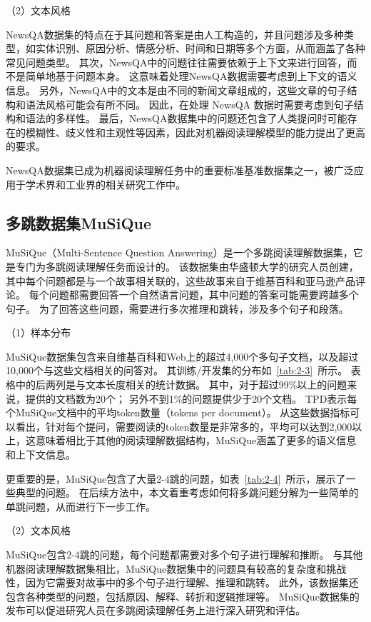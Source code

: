 

（2）文本风格

NewsQA数据集的特点在于其问题和答案是由人工构造的，并且问题涉及多种类型，如实体识别、原因分析、情感分析、时间和日期等多个方面，从而涵盖了各种常见问题类型。
其次，NewsQA中的问题往往需要依赖于上下文来进行回答，而不是简单地基于问题本身。
这意味着处理NewsQA数据需要考虑到上下文的语义信息。
另外，NewsQA中的文本是由不同的新闻文章组成的，这些文章的句子结构和语法风格可能会有所不同。
因此，在处理 NewsQA 数据时需要考虑到句子结构和语法的多样性。
最后，NewsQA数据集中的问题还包含了人类提问时可能存在的模糊性、歧义性和主观性等因素，因此对机器阅读理解模型的能力提出了更高的要求。

NewsQA数据集已成为机器阅读理解任务中的重要标准基准数据集之一，被广泛应用于学术界和工业界的相关研究工作中。

\subsection{多跳数据集MuSiQue}
MuSiQue（Multi-Sentence Question Answering）是一个多跳阅读理解数据集，它是专门为多跳阅读理解任务而设计的。
该数据集由华盛顿大学的研究人员创建，其中每个问题都是与一个故事相关联的，这些故事来自于维基百科和亚马逊产品评论。
每个问题都需要回答一个自然语言问题，其中问题的答案可能需要跨越多个句子。
为了回答这些问题，需要进行多次推理和跳转，涉及多个句子和段落。


（1）样本分布

MuSiQue数据集包含来自维基百科和Web上的超过4,000个多句子文档，以及超过10,000个与这些文档相关的问答对。
其训练/开发集的分布如~\ref{tab:2-3}~所示。
表格中的后两列是与文本长度相关的统计数据。
其中，对于超过99\%以上的问题来说，提供的文档数为20个；
另外不到1\%的问题提供少于20个文档。
TPD表示每个MuSiQue文档中的平均token数量（tokens per document）。
从这些数据指标可以看出，针对每个提问，需要阅读的token数量是非常多的，平均可以达到2,000以上，这意味着相比于其他的阅读理解数据结构，MuSiQue涵盖了更多的语义信息和上下文信息。



更重要的是，MuSiQue包含了大量2-4跳的问题，如表~\ref{tab:2-4}~所示，展示了一些典型的问题。
在后续方法中，本文着重考虑如何将多跳问题分解为一些简单的单跳问题，从而进行下一步工作。



（2）文本风格

MuSiQue包含2-4跳的问题，每个问题都需要对多个句子进行理解和推断。
与其他机器阅读理解数据集相比，MuSiQue数据集中的问题具有较高的复杂度和挑战性，因为它需要对故事中的多个句子进行理解、推理和跳转。
此外，该数据集还包含各种类型的问题，包括原因、解释、转折和逻辑推理等。
MuSiQue数据集的发布可以促进研究人员在多跳阅读理解任务上进行深入研究和评估。


